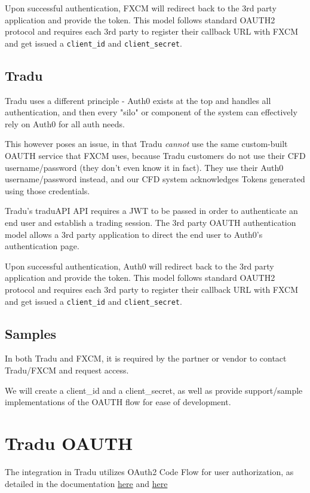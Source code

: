 \documentclass[11pt]{article}
\begin{document}
Upon successful authentication, FXCM will redirect back to the 3rd party application and provide the token.  This model follows standard OAUTH2 protocol and requires each 3rd party to register their callback URL with FXCM and get issued a \verb|client_id| and \verb|client_secret|.

\subsection{Tradu}

Tradu uses a different principle - Auth0 exists at the top and handles all authentication, and then every "silo" or component of the system can effectively rely on Auth0 for all auth needs.

This however poses an issue, in that Tradu \textit{cannot} use the same custom-built OAUTH service that FXCM uses, because Tradu customers do not use their CFD username/password (they don't even know it in fact). They use their Auth0 username/password instead, and our CFD system acknowledges Tokens generated using those credentials.

Tradu’s traduAPI API requires a JWT to be passed in order to authenticate an end user and establish a trading session.  The 3rd party OAUTH authentication model allows a 3rd party application to direct the end user to Auth0’s authentication page.  

Upon successful authentication, Auth0 will redirect back to the 3rd party application and provide the token. This model follows standard OAUTH2 protocol and requires each 3rd party to register their callback URL with FXCM and get issued a \verb|client_id| and \verb|client_secret|.

\subsection{Samples}
In both Tradu and FXCM, it is required by the partner or vendor to contact Tradu/FXCM and request access. 

We will create a client\_id and a client\_secret, as well as provide support/sample implementations of the OAUTH flow for ease of development.

\newpage
\section{Tradu OAUTH}

The integration in Tradu utilizes OAuth2 Code Flow for user authorization, as detailed in the documentation \href{https://auth0.com/docs/get-started/authentication-and-authorization-flow/authorization-code-flow}{here} and \href{https://www.tradingview.com/broker-api-docs/trading/authentication/#oauth2-code-flow}{here}
\end{document}
